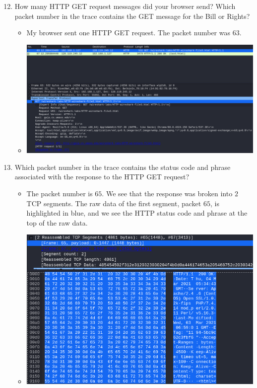 \documentclass[11pt]{article}
\begin{document}
\begin{enumerate}
  \setcounter{enumi}{11}
\item How many HTTP GET request messages did your browser send?  Which packet
  number in the trace contains the GET message for the Bill or Rights?
  \begin{itemize}
  \item My browser sent one HTTP GET request.  The packet number was $63$.
  \item \includegraphics[width=\textwidth]{img/ws-long-get}
  \end{itemize}
\item Which packet number in the trace contains the status code and phrase
  associated with the response to the HTTP GET request?
  \begin{itemize}
  \item The packet number is $65$.  We see that the response was broken into $2$
    TCP segments.  The raw data of the first segment, packet $65$, is
    highlighted in blue, and we see the HTTP status code and phrase at the top
    of the raw data.
  \item \includegraphics[width=\textwidth]{img/ws-packet-number-long-doc}

\end{itemize}
\end{enumerate}
\end{document}
